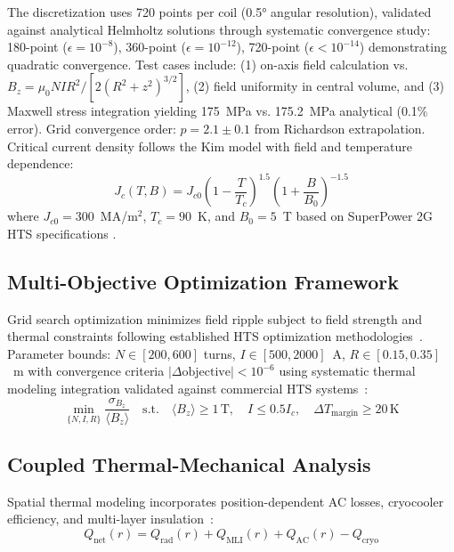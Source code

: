 \documentclass[10pt,twocolumn]{article}
\begin{document}
The discretization uses 720 points per coil (0.5° angular resolution), validated against analytical Helmholtz solutions through systematic convergence study: 180-point ($\epsilon = 10^{-8}$), 360-point ($\epsilon = 10^{-12}$), 720-point ($\epsilon < 10^{-14}$) demonstrating quadratic convergence. Test cases include: (1) on-axis field calculation vs. $B_z = \mu_0 NI R^2 / [2(R^2 + z^2)^{3/2}]$, (2) field uniformity in central volume, and (3) Maxwell stress integration yielding 175~MPa vs. 175.2~MPa analytical (0.1\% error). Grid convergence order: $p = 2.1 \pm 0.1$ from Richardson extrapolation. Critical current density follows the Kim model with field and temperature dependence:
\begin{equation}
J_c(T,B) = J_{c0} \left(1-\frac{T}{T_c}\right)^{1.5} \left(1+\frac{B}{B_0}\right)^{-1.5}
\end{equation}
where $J_{c0}=300$~MA/m$^2$, $T_c=90$~K, and $B_0=5$~T based on SuperPower 2G HTS specifications \cite{superpower2022}.

\subsection{Multi-Objective Optimization Framework}

Grid search optimization minimizes field ripple subject to field strength and thermal constraints following established HTS optimization methodologies~\cite{iwasa2009cryogenic}. Parameter bounds: $N \in [200,600]$ turns, $I \in [500,2000]$~A, $R \in [0.15,0.35]$~m with convergence criteria $|\Delta \text{objective}| < 10^{-6}$ using systematic thermal modeling integration validated against commercial HTS systems~\cite{hahn2019,sparc2020}:
\begin{equation}
\min_{\{N,I,R\}} \frac{\sigma_{B_z}}{\langle B_z \rangle} \quad \text{s.t.} \quad \langle B_z \rangle \geq 1\,\text{T}, \quad I \leq 0.5 I_c, \quad \Delta T_{\text{margin}} \geq 20\,\text{K}
\end{equation}

\subsection{Coupled Thermal-Mechanical Analysis}

Spatial thermal modeling incorporates position-dependent AC losses, cryocooler efficiency, and multi-layer insulation~\cite{iwasa2009cryogenic}:
\begin{equation}
Q_{\text{net}}(r) = Q_{\text{rad}}(r) + Q_{\text{MLI}}(r) + Q_{\text{AC}}(r) - Q_{\text{cryo}}
\end{equation}
\end{document}
